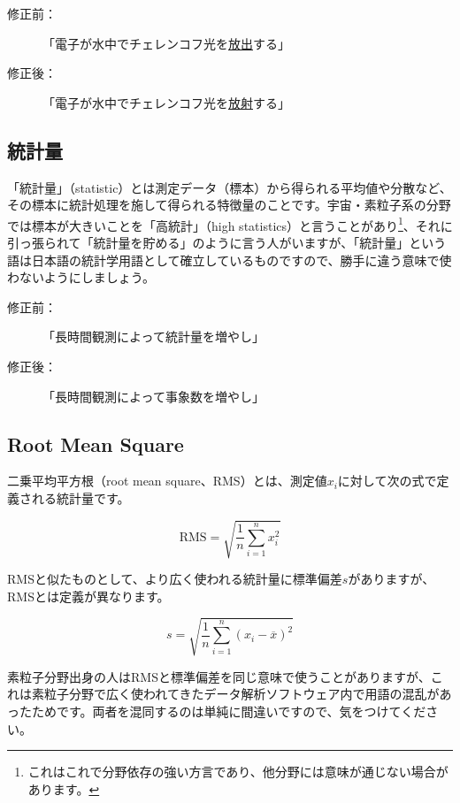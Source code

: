 \begin{description}
\item[修正前：]「電子が水中でチェレンコフ光を\underline{放出}する」
\item[修正後：]「電子が水中でチェレンコフ光を\underline{放射}する」
\end{description}

\subsection{統計量}

「統計量」（statistic）とは測定データ（標本）から得られる平均値や分散など、その標本に統計処理を施して得られる特徴量のことです。宇宙・素粒子系の分野では標本が大きいことを「高統計」（high statistics）と言うことがあり\footnote{これはこれで分野依存の強い方言であり、他分野には意味が通じない場合があります。}、それに引っ張られて「統計量を貯める」のように言う人がいますが、「統計量」という語は日本語の統計学用語として確立しているものですので、勝手に違う意味で使わないようにしましょう。

\begin{description}
\item[修正前：]「長時間観測によって統計量を増やし」
\item[修正後：]「長時間観測によって事象数を増やし」
\end{description}

\subsection{Root Mean Square}

二乗平均平方根（root mean square、RMS）とは、測定値$x_i$に対して次の式で定義される統計量です。

\begin{equation}
\mathrm{RMS} = \sqrt{{\frac{1}{n} \sum \limits _{i=1}^n x_{i}^2}}
\end{equation}

RMSと似たものとして、より広く使われる統計量に標準偏差$s$がありますが、RMSとは定義が異なります。

\begin{equation}
 s = \sqrt{\frac{1}{n} \sum \limits _{i=1}^n (x_i - {\overline{x}})^2}
\end{equation}

素粒子分野出身の人はRMSと標準偏差を同じ意味で使うことがありますが、これは素粒子分野で広く使われてきたデータ解析ソフトウェア内で用語の混乱があったためです。両者を混同するのは単純に間違いですので、気をつけてください。

